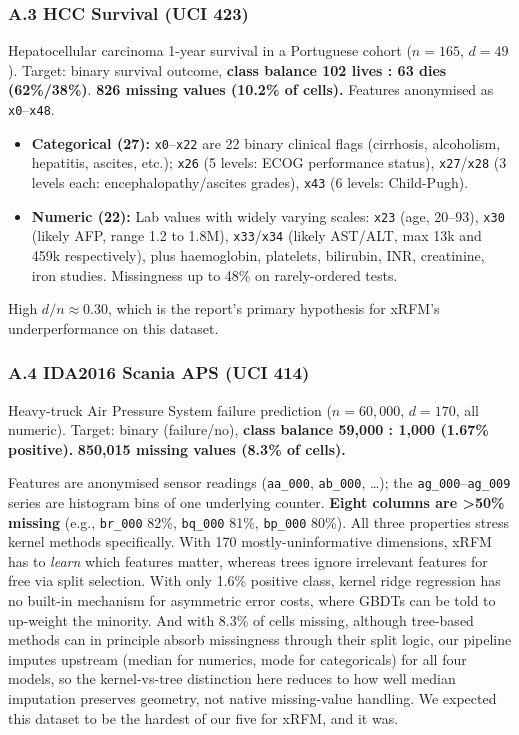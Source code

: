 \documentclass[
  11pt,
  onecolumn]{article}
\providecommand{\tightlist}{%
  \setlength{\itemsep}{0pt}\setlength{\parskip}{0pt}}
\begin{document}
\subsubsection{A.3 HCC Survival (UCI
423)}\label{a.3-hcc-survival-uci-423}

Hepatocellular carcinoma 1-year survival in a Portuguese cohort
(\(n=165\), \(d=49\)). Target: binary survival outcome, \textbf{class
balance 102 lives : 63 dies (62\%/38\%)}. \textbf{826 missing values
(10.2\% of cells).} Features anonymised as \texttt{x0}--\texttt{x48}.

\begin{itemize}
\tightlist
\item
  \textbf{Categorical (27):} \texttt{x0}--\texttt{x22} are 22 binary
  clinical flags (cirrhosis, alcoholism, hepatitis, ascites, etc.);
  \texttt{x26} (5 levels: ECOG performance status),
  \texttt{x27}/\texttt{x28} (3 levels each: encephalopathy/ascites
  grades), \texttt{x43} (6 levels: Child-Pugh).
\item
  \textbf{Numeric (22):} Lab values with widely varying scales:
  \texttt{x23} (age, 20--93), \texttt{x30} (likely AFP, range 1.2 to
  1.8M), \texttt{x33}/\texttt{x34} (likely AST/ALT, max 13k and 459k
  respectively), plus haemoglobin, platelets, bilirubin, INR,
  creatinine, iron studies. Missingness up to 48\% on rarely-ordered
  tests.
\end{itemize}

High \(d/n \approx 0.30\), which is the report's primary hypothesis for
xRFM's underperformance on this dataset.

\subsubsection{A.4 IDA2016 Scania APS (UCI
414)}\label{a.4-ida2016-scania-aps-uci-414}

Heavy-truck Air Pressure System failure prediction (\(n=60{,}000\),
\(d=170\), all numeric). Target: binary (failure/no), \textbf{class
balance 59,000 : 1,000 (1.67\% positive).} \textbf{850,015 missing
values (8.3\% of cells).}

Features are anonymised sensor readings (\texttt{aa\_000},
\texttt{ab\_000}, \ldots); the \texttt{ag\_000}--\texttt{ag\_009} series
are histogram bins of one underlying counter. \textbf{Eight columns are
\textgreater50\% missing} (e.g., \texttt{br\_000} 82\%, \texttt{bq\_000}
81\%, \texttt{bp\_000} 80\%). All three properties stress kernel methods
specifically. With 170 mostly-uninformative dimensions, xRFM has to
\emph{learn} which features matter, whereas trees ignore irrelevant
features for free via split selection. With only 1.6\% positive class,
kernel ridge regression has no built-in mechanism for asymmetric error
costs, where GBDTs can be told to up-weight the minority. And with 8.3\%
of cells missing, although tree-based methods can in principle absorb
missingness through their split logic, our pipeline imputes upstream
(median for numerics, mode for categoricals) for all four models, so
the kernel-vs-tree distinction here reduces to how well median
imputation preserves geometry, not native missing-value handling.
We expected this dataset to be the hardest of our five for xRFM, and it
was.
\end{document}
